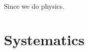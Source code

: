 \begin{savequote}[75mm]
Since we do physics.
\end{savequote}

\chapter{Systematics}
\label{sec:systematics}
